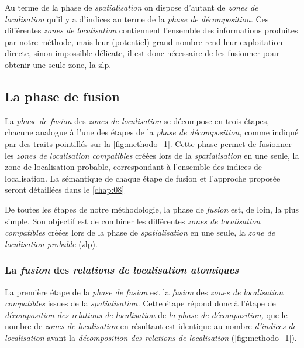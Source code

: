 Au terme de la phase de \emph{spatialisation} on dispose d'autant de
\emph{zones de localisation} qu'il y a d'indices au terme de la
\emph{phase de décomposition.} Ces différentes \emph{zones de
  localisation} contiennent l'ensemble des informations produites par
notre méthode, mais leur (potentiel) grand nombre rend leur
exploitation directe, sinon impossible délicate, il est donc
nécessaire de les fusionner pour obtenir une seule zone, la \ac{zlp}.

\subsection{La phase de fusion}

La \emph{phase de fusion} des \emph{zones de localisation} se
décompose en trois étapes, chacune analogue à l'une des étapes de la
\emph{phase de décomposition,} comme indiqué par des traits pointillés
sur la \autoref{fig:methodo_1}. Cette phase permet de fusionner les
\emph{zones de localisation compatibles} créées lors de la
\emph{spatialisation} en une seule, la zone de localisation probable,
correspondant à l'ensemble des indices de localisation. La sémantique
de chaque étape de fusion et l'approche proposée seront détaillées
dans le \autoref{chap:08}

De toutes les étapes de notre méthodologie, la phase de \emph{fusion}
est, de loin, la plus simple. Son objectif est de combiner les
différentes \emph{zones de localisation compatibles} créées lors de la
phase de \emph{spatialisation} en une seule, la \emph{zone de
  localisation probable} (\ac{zlp}).

\subsubsection{La \emph{fusion} des \emph{relations de localisation
    atomiques}}

La première étape de la \emph{phase de fusion} est la \emph{fusion}
des \emph{zones de localisation compatibles} issues de la
\emph{spatialisation.} Cette étape répond donc à l'étape de
\emph{décomposition des relations de localisation} de \emph{la phase
  de décomposition,} \ie que le nombre de \emph{zones de localisation}
en résultant est identique au nombre \emph{d'indices de localisation}
avant la \emph{décomposition des relations de localisation}
(\autoref{fig:methodo_1}).

